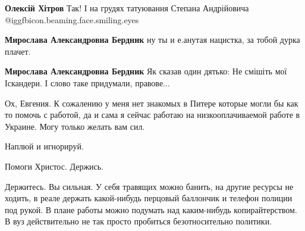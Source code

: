 \begin{itemize}
\begin{itemize}
\textbf{Олексій Хітров} Так! І на грудях татуювання Степана Андрійовича  @igg{fbicon.beaming.face.smiling.eyes} 

\textbf{Мирослава Александровна Бердник} ну ты и е.анутая нацистка, за тобой дурка плачет.

\textbf{Мирослава Александровна Бердник} Як сказав один дятько: Не смішіть мої Іскандери. І слово таке придумали, правове...
\end{itemize} %


Ох, Евгения. К сожалению у меня нет знакомых в Питере которые могли бы как то
помочь с работой, да и сама я сейчас работаю на низкооплачиваемой работе в
Украине. Могу только желать вам сил.


Наплюй и игнорируй.

Помоги Христос. Держись.


Держитесь. Вы сильная. У себя травящих можно банить, на другие ресурсы не
ходить, в реале держать какой-нибудь перцовый баллончик и телефон полиции под
рукой. В плане работы можно подумать над каким-нибудь копирайтерством. В вуз
действительно не так просто пробиться безотносительно политики.

\end{itemize} %
